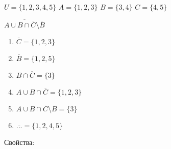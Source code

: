 \begin{eg}
$U = \{1,2,3,4,5\}$
$A = \{1, 2, 3\}$
$B = \{3, 4\}$
$C = \{4, 5\}$

$\overline{A \cup B \cap \overline{C} \setminus \overline{B}}$
\begin{enumerate}
    \item $\overline{C} = \{1, 2, 3\}$
    \item $\overline{B} = \{1, 2, 5\}$
    \item $B \cap \overline{C} = \{3\}$
    \item $A \cup B \cap \overline{C} = \{1, 2, 3\}$
    \item $A \cup B \cap \overline{C} \setminus \overline{B} = \{3\}$
    \item $\overline{...} = \{1, 2, 4, 5\}$
\end{enumerate}
\end{eg}

Свойства:

